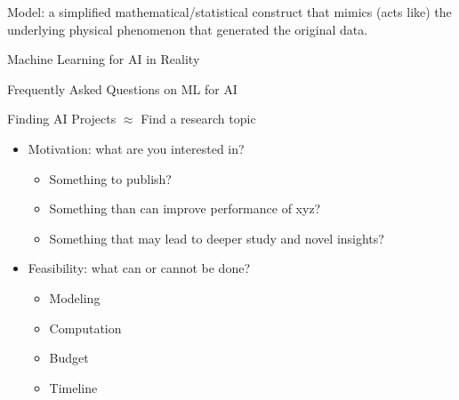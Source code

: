 \documentclass[aspectratio=169,xcolor=dvipsnames,svgnames,x11names,fleqn]{beamer}
\begin{document}
\begin{frame}
\begin{itemize}
  {    \item {\color{MediumBlue}Model}: a simplified mathematical/statistical construct that mimics (acts like) the underlying physical phenomenon that generated the original data.}
   \end{itemize}
 \end{frame}


\begin{subsectionframe}{Machine Learning for AI in Reality}
\end{subsectionframe}


\begin{frame}{Frequently Asked Questions on ML for AI}

\begin{itemize}


  {  
 \item 
 Finding AI Projects $\approx$ Find a research topic
 \begin{itemize}
\item  Motivation: what are you interested in?
\begin{itemize}
\item Something to publish?
\item Something than can improve performance of xyz?
\item Something that may lead to deeper study and novel insights?
\end{itemize}
 \item Feasibility: what can or cannot be done? 
 \begin{itemize}
 \item Modeling
 \item Computation
 \item Budget
 \item Timeline
 \end{itemize}
 \end{itemize}
 }







\end{itemize}
\end{frame}
\end{document}
